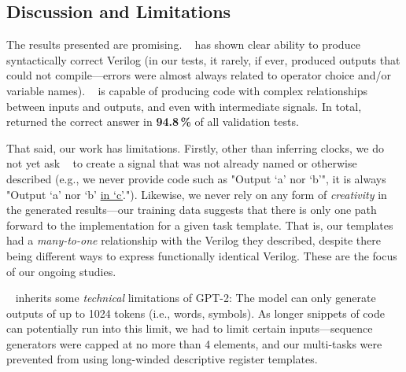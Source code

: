 
\subsection{Discussion and Limitations}

The results presented are promising.
\sol~ has shown clear ability to produce syntactically correct Verilog (in our tests, it rarely, if ever, produced outputs that could not compile---errors were almost always related to operator choice and/or variable names).
\sol~ is capable of producing code with complex relationships between inputs and outputs, and even with intermediate signals. In total, \sol~ returned the correct answer in \textbf{94.8\,\%} of all validation tests.

That said, our work has limitations.
Firstly, other than inferring clocks, we do not yet ask \sol~ to create a signal that was not already named or otherwise described (e.g., we never provide code such as "Output `a' nor `b'", it is always "Output `a' nor `b' \underline{in `c'}.").
Likewise, we never rely on any form of \emph{creativity} in the generated results---our training data suggests that there %
is only one path forward to the implementation for a given task template. 
That is, our templates had a \emph{many-to-one} relationship with the Verilog they described, despite there being different ways to express functionally identical Verilog. %
These are the focus of our ongoing  studies.%

\sol~ inherits some \emph{technical} limitations of GPT-2: The model can only generate outputs of up to 1024 tokens (i.e., words, symbols). As longer snippets of code can potentially run into this limit, we had to limit certain inputs---sequence generators were capped at no more than 4 elements, and our multi-tasks were prevented from using long-winded descriptive register templates.
